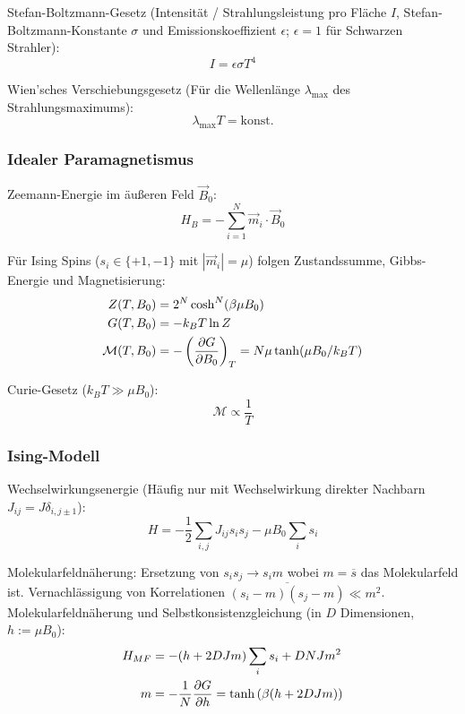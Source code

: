 			\noindent
			Stefan-Boltzmann-Gesetz (Intensität / Strahlungsleistung pro Fläche $I$, Stefan-Boltzmann-Konstante $\sigma$ und Emissionskoeffizient $\epsilon$; $\epsilon=1$ für Schwarzen Strahler):
			\begin{equation}
				I = \epsilon\sigma T^4
			\end{equation}

			\noindent
			Wien'sches Verschiebungsgesetz (Für die Wellenlänge $\lambda_{\max}$ des Strahlungsmaximums):
			\begin{equation}
				\lambda_{\max} T = \mathrm{konst}.
			\end{equation}

		\subsubsection{Idealer Paramagnetismus}
			\noindent
			Zeemann-Energie im äußeren Feld $\vec{B}_0$:
			\begin{equation}
				H_B = -\sum_{i=1}^N \vec{m}_i \cdot \vec{B}_0
			\end{equation}

			\noindent
			Für Ising Spins ($s_i\in\lbrace +1, -1\rbrace$ mit $|\vec{m}_i| = \mu$) folgen Zustandssumme, Gibbs-Energie und Magnetisierung:
			\begin{equation}
				\begin{aligned}
					Z(T,B_0) &= 2^N \cosh^N (\beta\mu B_0) \\
					G(T,B_0) &= -k_B T \ln Z \\
					\mathcal{M}(T,B_0) &= -\left(\frac{\partial G}{\partial B_0}\right)_T = N\mu \tanh(\mu B_0 /k_B T)
				\end{aligned}
			\end{equation}

			\noindent
			Curie-Gesetz ($k_B T \gg \mu B_0$):
			\begin{equation}
				\mathcal{M} \propto \frac{1}{T}
			\end{equation}

		\subsubsection{Ising-Modell}
			\noindent
			Wechselwirkungsenergie (Häufig nur mit Wechselwirkung direkter Nachbarn $J_{ij} = J \delta_{i,j\pm 1}$):
			\begin{equation}
				H = -\frac{1}{2}\sum_{i,j} J_{ij} s_i s_j -\mu B_0 \sum_i s_i
			\end{equation}

			\noindent
			Molekularfeldnäherung: \newline Ersetzung von $s_i s_j \rightarrow s_i m$ wobei $m = \overline{s}$ das Molekularfeld ist. Vernachlässigung von Korrelationen $\overline{(s_i-m)(s_j-m)}\ll m^2$. \nl
			Molekularfeldnäherung und Selbstkonsistenzgleichung (in $D$ Dimensionen, $h:=\mu B_0$):
			\begin{equation}
				\begin{aligned}
					H_{MF} &= -(h + 2 D J m) \sum_i s_i + D N J m^2 \\
					m &= -\frac{1}{N}\frac{\partial G}{\partial h} = \tanh\left({\beta(h + 2 D J m)}\right)
				\end{aligned}
			\end{equation}
